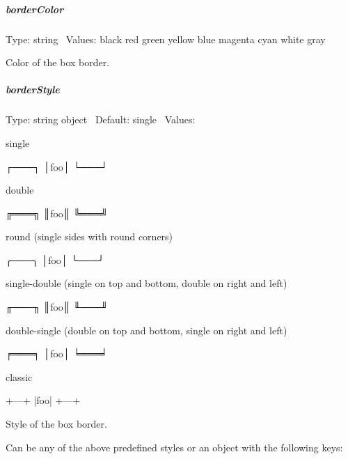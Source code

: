 \subparagraph*{border\+Color}

Type\+: {\ttfamily string}~\newline
 Values\+: {\ttfamily black} {\ttfamily red} {\ttfamily green} {\ttfamily yellow} {\ttfamily blue} {\ttfamily magenta} {\ttfamily cyan} {\ttfamily white} {\ttfamily gray}

Color of the box border.

\subparagraph*{border\+Style}

Type\+: {\ttfamily string} {\ttfamily object}~\newline
 Default\+: {\ttfamily single}~\newline
 Values\+:
\begin{DoxyItemize}
\item {\ttfamily single} 
\begin{DoxyCode}
┌───┐
│foo│
└───┘
\end{DoxyCode}

\item {\ttfamily double} 
\begin{DoxyCode}
╔═══╗
║foo║
╚═══╝
\end{DoxyCode}

\item {\ttfamily round} ({\ttfamily single} sides with round corners) 
\begin{DoxyCode}
╭───╮
│foo│
╰───╯
\end{DoxyCode}

\item {\ttfamily single-\/double} ({\ttfamily single} on top and bottom, {\ttfamily double} on right and left) 
\begin{DoxyCode}
╓───╖
║foo║
╙───╜
\end{DoxyCode}

\item {\ttfamily double-\/single} ({\ttfamily double} on top and bottom, {\ttfamily single} on right and left) 
\begin{DoxyCode}
╒═══╕
│foo│
╘═══╛
\end{DoxyCode}

\item {\ttfamily classic} 
\begin{DoxyCode}
+---+
|foo|
+---+
\end{DoxyCode}

\end{DoxyItemize}

Style of the box border.

Can be any of the above predefined styles or an object with the following keys\+:


